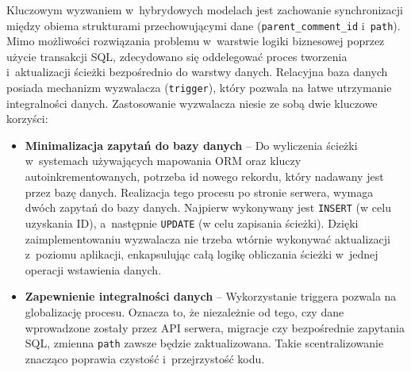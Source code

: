 Kluczowym wyzwaniem w~hybrydowych modelach jest zachowanie synchronizacji między obiema strukturami przechowującymi dane 
(\texttt{parent\_comment\_id} i~\texttt{path}). Mimo możliwości rozwiązania problemu w~warstwie logiki biznesowej poprzez 
użycie transakcji SQL, zdecydowano się oddelegować proces tworzenia i~aktualizacji ścieżki bezpośrednio do warstwy danych.
Relacyjna baza danych posiada mechanizm wyzwalacza (\texttt{trigger}), który pozwala na łatwe utrzymanie integralności danych. 
Zastosowanie wyzwalacza niesie ze sobą dwie kluczowe korzyści:
\begin{itemize}
    \item \textbf{Minimalizacja zapytań do bazy danych} -- Do wyliczenia ścieżki w~systemach używających 
    mapowania ORM oraz kluczy autoinkrementowanych, potrzeba id nowego rekordu, który nadawany jest przez bazę danych. Realizacja 
    tego procesu po stronie serwera, wymaga dwóch zapytań do bazy danych. Najpierw wykonywany jest \texttt{INSERT} (w celu uzyskania ID), 
    a~następnie \texttt{UPDATE} (w celu zapisania ścieżki). Dzięki zaimplementowaniu wyzwalacza nie trzeba wtórnie wykonywać aktualizacji 
    z~poziomu aplikacji, enkapsulując całą logikę obliczania ścieżki w~jednej operacji wstawienia danych.
    \item \textbf{Zapewnienie integralności danych} -- Wykorzystanie triggera pozwala na globalizację procesu. Oznacza to, że niezależnie 
    od tego, czy dane wprowadzone zostały przez API serwera, migracje czy bezpośrednie zapytania SQL, zmienna \texttt{path} zawsze będzie zaktualizowana.
    Takie scentralizowanie znacząco poprawia czystość i~przejrzystość kodu. 
\end{itemize} 

